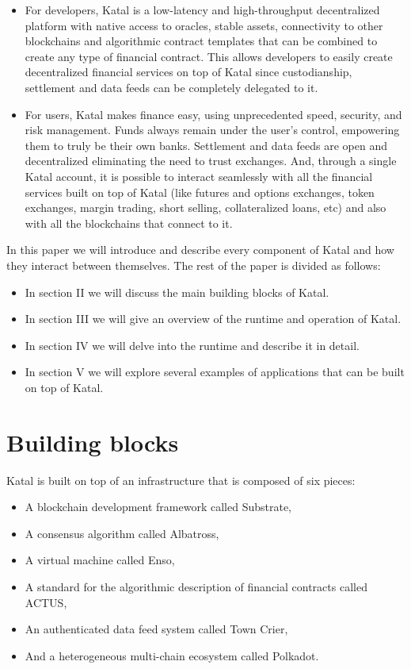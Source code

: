 \documentclass[conference]{IEEEtran}
\begin{document}
\begin{itemize}
	\item For developers, Katal is a low-latency and high-throughput decentralized platform with native access to oracles, stable assets, connectivity to other blockchains and algorithmic contract templates that can be combined to create any type of financial contract. This allows developers to easily create decentralized financial services on top of Katal since custodianship, settlement and data feeds can be completely delegated to it.
	\item For users, Katal makes finance easy, using unprecedented speed, security, and risk management. Funds always remain under the user's control, empowering them to truly be their own banks. Settlement and data feeds are open and decentralized eliminating the need to trust exchanges. And, through a single Katal account, it is possible to interact seamlessly with all the financial services built on top of Katal (like futures and options exchanges, token exchanges, margin trading, short selling, collateralized loans, etc) and also with all the blockchains that connect to it.
\end{itemize}

In this paper we will introduce and describe every component of Katal and how they interact between themselves. The rest of the paper is divided as follows:

\begin{itemize}
	\item In section II we will discuss the main building blocks of Katal.
	\item In section III we will give an overview of the runtime and operation of Katal.
	\item In section IV we will delve into the runtime and describe it in detail.
	\item In section V we will explore several examples of applications that can be built on top of Katal.
\end{itemize}

\section{Building blocks}
Katal is built on top of an infrastructure that is composed of six pieces:

\begin{itemize}
	\item A blockchain development framework called Substrate,
	\item A consensus algorithm called Albatross,
	\item A virtual machine called Enso,
	\item A standard for the algorithmic description of financial contracts called ACTUS,
	\item An authenticated data feed system called Town Crier,
	\item And a heterogeneous multi-chain ecosystem called Polkadot.
\end{itemize}
\end{document}
